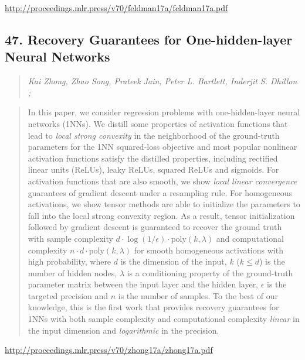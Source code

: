 \documentclass{article}
\begin{document}
\href{http://proceedings.mlr.press/v70/feldman17a/feldman17a.pdf}{http://proceedings.mlr.press/v70/feldman17a/feldman17a.pdf}

\subsection{47. Recovery Guarantees for One-hidden-layer Neural Networks}

\begin{quote}
\footnotesize{\textit{Kai Zhong, Zhao Song, Prateek Jain, Peter L. Bartlett, Inderjit S. Dhillon ;}}

\end{quote}

\begin{quote}
    In this paper, we consider regression problems with one-hidden-layer neural networks (1NNs). We distill some properties of activation functions that lead to   \textit{local strong convexity} in the neighborhood of the ground-truth parameters for the 1NN squared-loss objective and most popular nonlinear activation functions  satisfy the distilled properties, including rectified linear units (ReLUs), leaky ReLUs, squared ReLUs and sigmoids. For activation functions that are also smooth, we show \textit{local linear convergence} guarantees of gradient descent under a resampling rule. For homogeneous activations, we show tensor methods are able to initialize the parameters to fall into the local strong convexity region. As a result, tensor initialization followed by gradient descent is guaranteed to recover the ground truth with sample complexity $ d \cdot \log(1/\epsilon) \cdot \mathrm{poly}(k,\lambda )$ and computational complexity $n\cdot d \cdot \mathrm{poly}(k,\lambda) $ for smooth  homogeneous activations with high probability, where $d$ is the dimension of the input, $k$ ($k\leq d$) is the number of hidden nodes, $\lambda$ is a conditioning  property of the ground-truth parameter matrix between the input layer and the hidden layer, $\epsilon$ is the targeted precision and $n$ is the number of samples. To the best of our knowledge, this is the first work that provides recovery guarantees for 1NNs with both sample complexity and computational complexity \textit{linear} in the input dimension and \textit{logarithmic} in the precision.  
\end{quote}

\href{http://proceedings.mlr.press/v70/zhong17a/zhong17a.pdf}{http://proceedings.mlr.press/v70/zhong17a/zhong17a.pdf}
\end{document}

